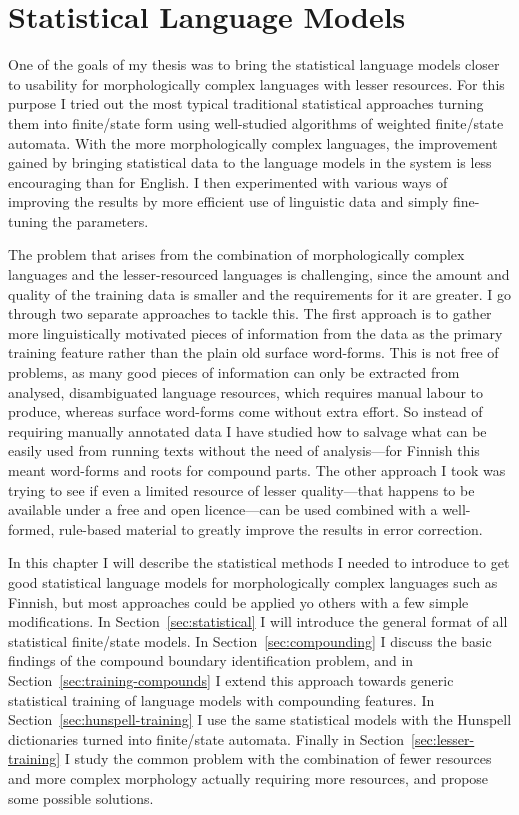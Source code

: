 \documentclass[officiallayout]{unihelcompling}
\begin{document}
\chapter{Statistical Language Models}
\label{chap:statistical-models}

One of the goals of my thesis was to bring the statistical language models
closer to usability for morphologically complex languages with lesser
resources. For this purpose I tried out the most typical traditional
statistical approaches turning them into finite\-/state form using well-studied
algorithms of weighted finite\-/state automata. With the more morphologically
complex languages, the improvement gained by bringing statistical data to the
language models in the system is less encouraging than for English. I then
experimented with various ways of improving the results by more efficient use
of linguistic data and simply fine-tuning the parameters.

The problem that arises from the combination of morphologically complex
languages and the lesser-resourced languages is challenging, since the amount
and quality of the training data is smaller and the requirements for it are
greater. I go through two separate approaches to tackle this. The first
approach is to gather more linguistically motivated pieces of information from
the data as the primary training feature rather than the plain old surface
word-forms. This is not free of problems, as many good pieces of information
can only be extracted from analysed, disambiguated language resources,
which requires manual labour to produce, whereas surface word-forms
come without extra effort. So instead of requiring manually annotated data I
have studied how to salvage what can be easily used from running texts without
the need of analysis---for Finnish this meant word-forms and roots for compound
parts. The other approach I took was trying to see if even a limited
resource of lesser quality---that happens to be available under a free and open
licence---can be used combined with a well-formed, rule-based material to
greatly improve the results in error correction.

In this chapter I will describe the statistical methods I needed to introduce
to get good statistical language models for morphologically complex languages
such as Finnish, but most approaches could be applied yo others with a
few simple modifications. In Section~\ref{sec:statistical} I will introduce the
general format of all statistical finite\-/state models.  In
Section~\ref{sec:compounding} I discuss the basic findings of the compound boundary
identification problem, and in Section~\ref{sec:training-compounds} I extend
this approach towards generic statistical training of language models with
compounding features. In Section~\ref{sec:hunspell-training} I use the same
statistical models with the Hunspell dictionaries turned into finite\-/state
automata. Finally in Section~\ref{sec:lesser-training} I study the common
problem with the combination of fewer resources and more complex morphology
actually requiring more resources, and propose some possible solutions.
\end{document}
